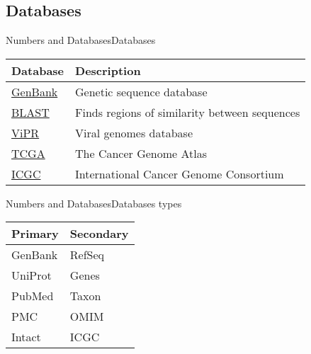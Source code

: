 \documentclass[10pt]{beamer}
\newcommand{\1}{
	\setbeamertemplate{background}{
		\texttt{[image: img/1]}
		\tikz[overlay] \fill[fill opacity=0.75,fill=white] (0,0) rectangle (-\paperwidth,\paperheight);
	}
}
\begin{document}
\subsection{Databases}

\begin{frame}{Numbers and Databases}{Databases}

\begin{tabular}{ll}
\textbf{Database} & \textbf{Description}                                                \\
\hline
\href{https://www.ncbi.nlm.nih.gov/genbank/}{GenBank}   & Genetic sequence database                                       \\
\href{https://blast.ncbi.nlm.nih.gov/Blast.cgi}{BLAST}    & Finds regions of similarity between sequences    \\
\href{https://www.viprbrc.org/}{ViPR}     & Viral genomes database                                                       \\
\href{https://www.cancer.gov/}{TCGA}     & The Cancer Genome Atlas                                                       \\
 \href{https://dcc.icgc.org/}{ICGC}     & International Cancer Genome Consortium                        \\      
\end{tabular}

\end{frame}


\begin{frame}{Numbers and Databases}{Databases types}
\centering
\begin{tabular}{ll}
\textbf{Primary} & \textbf{Secondary}                                \\
\hline
GenBank    & RefSeq    \\
UniProt    & Genes  \\
PubMed    & Taxon  \\
PMC    & OMIM  \\
Intact & ICGC \\
\end{tabular}

\end{frame}
\end{document}
